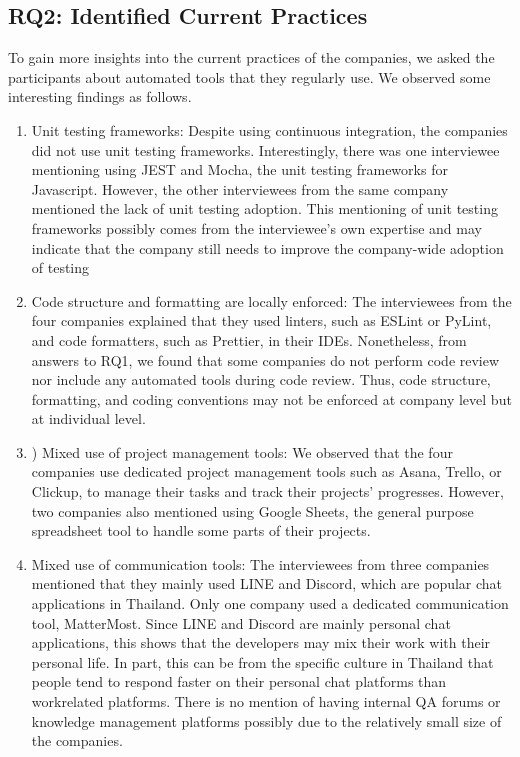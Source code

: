 \documentclass[conference]{IEEEtran}
\begin{document}
\subsection{RQ2: Identified Current Practices}
To gain more insights into the current practices of the
companies, we asked the participants about automated tools
that they regularly use. We observed some interesting findings
as follows.\\
\begin{enumerate}

  \item Unit testing frameworks: Despite using continuous integration, the companies did not use unit testing frameworks.
Interestingly, there was one interviewee mentioning using
JEST and Mocha, the unit testing frameworks for Javascript.
However, the other interviewees from the same company
mentioned the lack of unit testing adoption. This mentioning of
unit testing frameworks possibly comes from the interviewee’s
own expertise and may indicate that the company still needs
to improve the company-wide adoption of testing

  \item Code structure and formatting are locally enforced: The
interviewees from the four companies explained that they used
linters, such as ESLint or PyLint, and code formatters, such
as Prettier, in their IDEs. Nonetheless, from answers to RQ1,
we found that some companies do not perform code review
nor include any automated tools during code review. Thus,
code structure, formatting, and coding conventions may not
be enforced at company level but at individual level.
\item ) Mixed use of project management tools: We observed
that the four companies use dedicated project management
tools such as Asana, Trello, or Clickup, to manage their tasks
and track their projects’ progresses. However, two companies
also mentioned using Google Sheets, the general purpose
spreadsheet tool to handle some parts of their projects.
\item Mixed use of communication tools: The interviewees
from three companies mentioned that they mainly used LINE
and Discord, which are popular chat applications in Thailand.
Only one company used a dedicated communication tool,
MatterMost. Since LINE and Discord are mainly personal
chat applications, this shows that the developers may mix
their work with their personal life. In part, this can be
from the specific culture in Thailand that people tend to respond faster on their personal chat platforms than workrelated platforms. There is no mention of having internal QA
forums or knowledge management platforms possibly due to
the relatively small size of the companies.


\end{enumerate}
\end{document}
